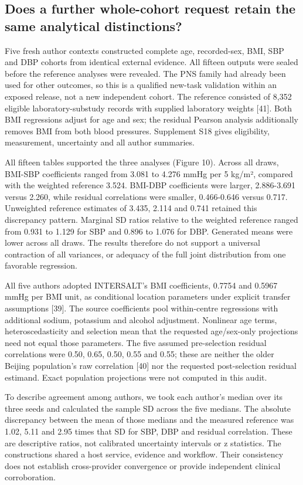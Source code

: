 \documentclass[11pt,letterpaper]{article}
\begin{document}
\subsection{Does a further whole-cohort request retain the same analytical distinctions?}

Five fresh author contexts constructed complete age, recorded-sex, BMI, SBP and DBP cohorts from identical external evidence. All fifteen outputs were sealed before the reference analyses were revealed. The PNS family had already been used for other outcomes, so this is a qualified new-task validation within an exposed release, not a new independent cohort. The reference consisted of 8,352 eligible laboratory-substudy records with supplied laboratory weights [41]. Both BMI regressions adjust for age and sex; the residual Pearson analysis additionally removes BMI from both blood pressures. Supplement S18 gives eligibility, measurement, uncertainty and all author summaries.


All fifteen tables supported the three analyses (Figure 10). Across all draws, BMI-SBP coefficients ranged from 3.081 to 4.276 mmHg per 5 kg/\allowbreak{}m², compared with the weighted reference 3.524. BMI-DBP coefficients were larger, 2.886-3.691 versus 2.260, while residual correlations were smaller, 0.466-0.646 versus 0.717. Unweighted reference estimates of 3.435, 2.114 and 0.741 retained this discrepancy pattern. Marginal SD ratios relative to the weighted reference ranged from 0.931 to 1.129 for SBP and 0.896 to 1.076 for DBP. Generated means were lower across all draws. The results therefore do not support a universal contraction of all variances, or adequacy of the full joint distribution from one favorable regression.


All five authors adopted INTERSALT's BMI coefficients, 0.7754 and 0.5967 mmHg per BMI unit, as conditional location parameters under explicit transfer assumptions [39]. The source coefficients pool within-centre regressions with additional sodium, potassium and alcohol adjustment. Nonlinear age terms, heteroscedasticity and selection mean that the requested age/\allowbreak{}sex-only projections need not equal those parameters. The five assumed pre-selection residual correlations were 0.50, 0.65, 0.50, 0.55 and 0.55; these are neither the older Beijing population's raw correlation [40] nor the requested post-selection residual estimand. Exact population projections were not computed in this audit.


To describe agreement among authors, we took each author's median over its three seeds and calculated the sample SD across the five medians. The absolute discrepancy between the mean of those medians and the measured reference was 1.02, 5.11 and 2.95 times that SD for SBP, DBP and residual correlation. These are descriptive ratios, not calibrated uncertainty intervals or z statistics. The constructions shared a host service, evidence and workflow. Their consistency does not establish cross-provider convergence or provide independent clinical corroboration.
\end{document}
